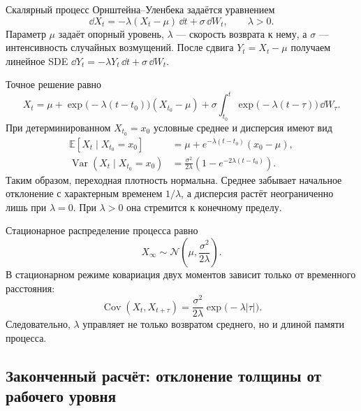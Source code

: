 Скалярный процесс Орнштейна--Уленбека задаётся уравнением
\begin{equation}
\label{eq:ou-sde-v04}
\dd X_t
=
-\lambda(X_t-\mu)\,\dd t
+
\sigma\,\dd W_t,
\qquad
\lambda>0.
\end{equation}
Параметр $\mu$ задаёт опорный уровень, $\lambda$ --- скорость возврата к нему, а $\sigma$ --- интенсивность случайных возмущений. После сдвига $Y_t=X_t-\mu$ получаем линейное SDE $\dd Y_t=-\lambda Y_t\,\dd t+\sigma\,\dd W_t$.

Точное решение равно
\begin{equation}
\label{eq:ou-solution-v04}
X_t
=
\mu
+
\exp\bigl(-\lambda(t-t_0)\bigr)(X_{t_0}-\mu)
+
\sigma\int_{t_0}^{t}
\exp\bigl(-\lambda(t-\tau)\bigr)\,\dd W_\tau.
\end{equation}
При детерминированном $X_{t_0}=x_0$ условные среднее и дисперсия имеют вид
\begin{align}
\label{eq:ou-mean-v04}
\mathbb E[X_t\mid X_{t_0}=x_0]
&=
\mu+
e^{ -\lambda(t-t_0)}(x_0-\mu),
\\
\label{eq:ou-variance-v04}
\operatorname{Var}(X_t\mid X_{t_0}=x_0)
&=
\frac{\sigma^2}{2\lambda}
\left(1-
e^{-2\lambda(t-t_0)}\right).
\end{align}
Таким образом, переходная плотность нормальна. Среднее забывает начальное отклонение с характерным временем $1/\lambda$, а дисперсия растёт неограниченно лишь при $\lambda=0$. При $\lambda>0$ она стремится к конечному пределу.

Стационарное распределение процесса равно
\begin{equation}
\label{eq:ou-stationary-law-v04}
X_{\infty}
\sim
\mathcal N\!\left(
\mu,
\frac{\sigma^2}{2\lambda}
\right).
\end{equation}
В стационарном режиме ковариация двух моментов зависит только от временного расстояния:
\begin{equation}
\label{eq:ou-autocovariance-v04}
\operatorname{Cov}(X_t,X_{t+\tau})
=
\frac{\sigma^2}{2\lambda}\exp\bigl(-\lambda|\tau|\bigr).
\end{equation}
Следовательно, $\lambda$ управляет не только возвратом среднего, но и длиной памяти процесса.

\subsection{Законченный расчёт: отклонение толщины от рабочего уровня}

